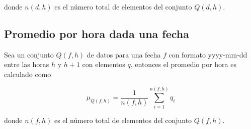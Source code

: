 donde $n(d,h)$ es el número total de elementos del conjunto $Q(d,h)$.

\subsection{Promedio por hora dada una fecha}

Sea un conjunto $Q(f,h)$ de datos para una fecha $f$ con formato yyyy-mm-dd  entre las horas $h$ y $h+1$ con elementos $q$, entonces el promedio por hora es calculado como

\begin{equation}
    \mu_{Q(f,h)} = \frac{1}{n(f,h)} \sum_{i=1}^{n(f,h)} q_i \label{eq:hourly_mean}
\end{equation}

donde $n(f,h)$ es el número total de elementos del conjunto $Q(f,h)$.